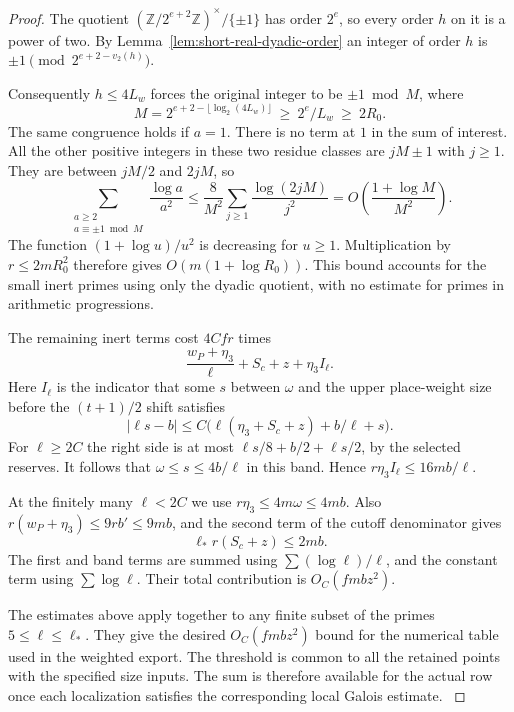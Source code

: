 \begin{proof}
The quotient
\((\mathbb Z/2^{e+2}\mathbb Z)^\times/\{\pm1\}\) has order \(2^e\),
so every order \(h\) on it is a power of two. By
Lemma~\ref{lem:short-real-dyadic-order} an integer of order \(h\) is
\(\pm1\pmod{2^{e+2-v_2(h)}}\).

Consequently \(h\le4L_w\) forces the original integer to
be \(\pm1\bmod M\), where
\[
 M=2^{e+2-\lfloor\log_2(4L_w)\rfloor}
       \ \ge\ 2^e/L_w\ \ge\ 2R_0 .
\]
The same congruence holds if \(a=1\). There is no term at
\(1\) in the sum of interest. All the other positive integers
in these two residue classes are \(jM\pm1\) with \(j\ge1\).
They are between \(jM/2\) and \(2jM\), so
\[
 \sum_{\substack{a\ge2\\a\equiv \pm1\bmod M}}
            \frac{\log a}{a^2}
   \le \frac8{M^2}\sum_{j\ge1}\frac{\log(2jM)}{j^2}
   =O\!\left(\frac{1+\log M}{M^2}\right).
\]
The function \((1+\log u)/u^2\) is decreasing for \(u\ge1\).
Multiplication by \(r\le2mR_0^2\) therefore gives
\(O(m(1+\log R_0))\). This bound accounts for the small
inert primes using only the dyadic quotient, with no estimate
for primes in arithmetic progressions.

The remaining inert terms cost \(4Cfr\) times
\[
  \frac{w_P+\eta_3}{\ell}+S_c+z+\eta_3 I_\ell .
\]
Here \(I_\ell\) is the indicator that some \(s\) between
\(\omega\) and the upper place-weight size before the
\((t+1)/2\) shift satisfies
\[
 |\ell s-b|\le
   C\bigl(\ell(\eta_3+S_c+z)+b/\ell+s\bigr).
\]
For \(\ell\ge2C\) the right side is at most
\(\ell s/8+b/2+\ell s/2\), by the selected reserves.
It follows that \(\omega\le s\le4b/\ell\) in this band.
Hence \(r\eta_3 I_\ell\le16mb/\ell\).

At the finitely
many \(\ell<2C\) we use \(r\eta_3\le4m\omega\le4mb\).
Also \(r(w_P+\eta_3)\le9rb'\le9mb\), and the second
term of the cutoff denominator gives
\[
 \ell_*r(S_c+z)\le2mb.
\]
The first and band terms
are summed using \(\sum (\log\ell)/\ell\), and the
constant term using \(\sum\log\ell\). Their total
contribution is \(O_C(fmbz^2)\).

The estimates above apply together to any finite subset of
the primes \(5\le\ell\le\ell_*\). They give the desired
\(O_C(fmbz^2)\) bound for the numerical table used in the
weighted export. The threshold is common to all the retained points with the specified size inputs.
The sum is therefore available for the actual row once each localization satisfies the corresponding local Galois estimate. \label{cor:prime-cost-sums-1}
\end{proof}

